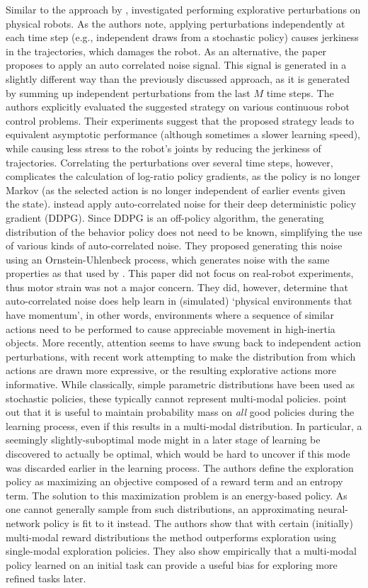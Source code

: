Similar to the approach by ,  investigated performing explorative perturbations on physical robots. As the authors note, applying perturbations independently at each time step (e.g., independent draws from a stochastic policy) causes jerkiness in the trajectories, which damages the robot. As an alternative, the paper proposes to apply an auto correlated noise signal. This signal is generated in a slightly different way than the previously discussed approach, as it is generated by summing up independent perturbations from the last $M$ time steps. The authors explicitly evaluated the suggested strategy on various continuous robot control problems. Their experiments suggest that the proposed strategy leads to equivalent asymptotic performance (although sometimes a slower learning speed), while causing less stress to the robot's joints by reducing the jerkiness of trajectories.
Correlating the perturbations over several time steps, however, complicates the calculation of log-ratio policy gradients, as the policy is no longer Markov (as the selected action is no longer independent of earlier events given the state).  instead apply auto-correlated noise for their deep deterministic policy gradient (DDPG). Since DDPG is an off-policy algorithm, the generating distribution of the behavior policy does not need to be known, simplifying the use of various kinds of auto-correlated noise. They proposed generating this noise using an Ornstein-Uhlenbeck process, which generates noise with the same properties as that used by . This paper did not focus on real-robot experiments, thus motor strain was not a major concern. They did, however, determine that auto-correlated noise does help learn in (simulated) `physical environments that have momentum', in other words, environments where a sequence of similar actions need to be performed to cause appreciable movement in high-inertia objects.
More recently, attention seems to have swung back to independent action perturbations, with recent work attempting to make the distribution from which actions are drawn more expressive, or the resulting explorative actions more informative. While classically, simple parametric distributions have been used as stochastic policies, these  typically cannot represent multi-modal policies.  point out that it is useful to maintain probability mass on \emph{all} good policies during the learning process, even if this results in a multi-modal distribution. In particular, a seemingly slightly-suboptimal mode might in a later stage of learning be discovered to actually be optimal, which would be hard to uncover if this mode was discarded earlier in the learning process. The authors define the exploration policy as maximizing an objective composed of a reward term and an entropy term. The solution to this maximization problem is an energy-based policy. As one cannot generally sample from such distributions, an approximating neural-network policy is fit to it instead. The authors show that with certain (initially) multi-modal reward distributions the method outperforms exploration using single-modal exploration policies. They also show empirically that a multi-modal policy learned on an initial task can provide a useful bias for exploring more refined tasks later.
